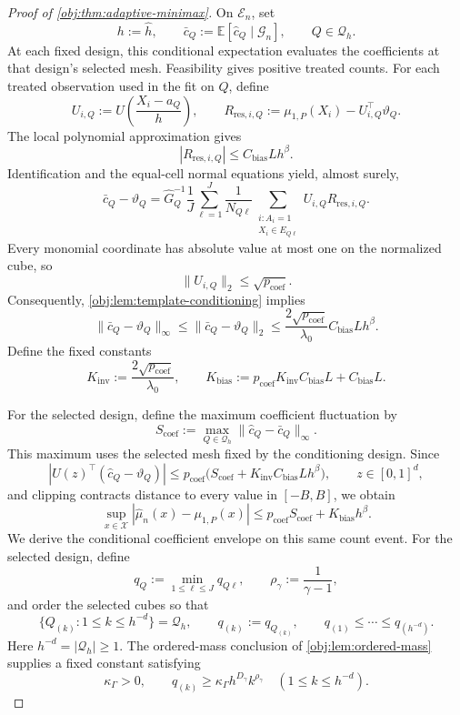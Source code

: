 \begin{proof}[Proof of \cref{obj:thm:adaptive-minimax}]
On \(\mathcal E_n\), set
\[
h:=\widehat h,
\qquad
\bar c_Q:=\mathbb E[\widehat c_Q\mid\mathcal G_n],
\qquad Q\in\mathcal Q_h.
\]
At each fixed design, this conditional expectation evaluates the coefficients at that design's selected mesh. Feasibility gives positive treated counts. For each treated observation used in the fit on \(Q\), define
\[
U_{i,Q}:=U\!\left(\frac{X_i-a_Q}{h}\right),
\qquad
R_{\mathrm{res},i,Q}
:=\mu_{1,P}(X_i)-U_{i,Q}^{\top}\vartheta_Q.
\]
The local polynomial approximation gives
\[
|R_{\mathrm{res},i,Q}|\le C_{\mathrm{bias}}Lh^\beta.
\]
Identification and the equal-cell normal equations yield, almost surely,
\[
\bar c_Q-\vartheta_Q
=
\widehat G_Q^{-1}
\frac1J\sum_{\ell=1}^J\frac1{N_{Q\ell}}
\sum_{\substack{i:A_i=1\\X_i\in E_{Q\ell}}}
U_{i,Q}R_{\mathrm{res},i,Q}.
\]
Every monomial coordinate has absolute value at most one on the normalized cube, so
\[
\|U_{i,Q}\|_2\le\sqrt{p_{\mathrm{coef}}}.
\]
Consequently, \cref{obj:lem:template-conditioning} implies
\[
\|\bar c_Q-\vartheta_Q\|_\infty
\le
\|\bar c_Q-\vartheta_Q\|_2
\le
\frac{2\sqrt{p_{\mathrm{coef}}}}{\lambda_0}
C_{\mathrm{bias}}Lh^\beta.
\]
Define the fixed constants
\[
K_{\mathrm{inv}}
:=\frac{2\sqrt{p_{\mathrm{coef}}}}{\lambda_0},
\qquad
K_{\mathrm{bias}}
:=p_{\mathrm{coef}}K_{\mathrm{inv}}C_{\mathrm{bias}}L
+C_{\mathrm{bias}}L.
\]

For the selected design, define the maximum coefficient fluctuation by
\[
S_{\mathrm{coef}}
:=
\max_{Q\in\mathcal Q_h}
\|\widehat c_Q-\bar c_Q\|_\infty.
\]
This maximum uses the selected mesh fixed by the conditioning design. Since
\[
|U(z)^\top(\widehat c_Q-\vartheta_Q)|
\le
p_{\mathrm{coef}}
\bigl(S_{\mathrm{coef}}+K_{\mathrm{inv}}C_{\mathrm{bias}}Lh^\beta\bigr),
\qquad z\in[0,1]^d,
\]
and clipping contracts distance to every value in \([-B,B]\), we obtain
\[
\sup_{x\in\mathcal X}
|\widehat\mu_n(x)-\mu_{1,P}(x)|
\le
p_{\mathrm{coef}}S_{\mathrm{coef}}+K_{\mathrm{bias}}h^\beta.
\]
We derive the conditional coefficient envelope on this same count event. For the selected design, define
\[
q_Q:=\min_{1\le\ell\le J}q_{Q\ell},
\qquad
\rho_\gamma:=\frac1{\gamma-1},
\]
and order the selected cubes so that
\[
\{Q_{(k)}:1\le k\le h^{-d}\}=\mathcal Q_h,
\qquad
q_{(k)}:=q_{Q_{(k)}},
\qquad
q_{(1)}\le\cdots\le q_{(h^{-d})}.
\]
Here \(h^{-d}=|\mathcal Q_h|\ge1\). The ordered-mass conclusion of \cref{obj:lem:ordered-mass} supplies a fixed constant satisfying
\[
\kappa_\Gamma>0,
\qquad
q_{(k)}\ge\kappa_\Gamma h^{D_\gamma}k^{\rho_\gamma}
\quad(1\le k\le h^{-d}).
\]


\end{proof}
